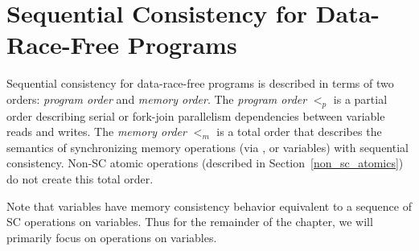 \section{Sequential Consistency for Data-Race-Free Programs}
\label{SC_for_DRF}

Sequential consistency for data-race-free programs is described in
terms of two orders: \textit{program order} and \textit{memory
order}. The \textit{program order} $<_p$ is a partial order describing
serial or fork-join parallelism dependencies between variable reads
and writes. The \textit{memory order} $<_m$ is a total order that
describes the semantics of synchronizing memory operations
(via ,  or  variables) with
sequential consistency. Non-SC atomic operations (described in
Section~\ref{non_sc_atomics}) do not create this total order.

Note that  variables have memory consistency
behavior equivalent to a sequence of SC operations on 
variables.  Thus for the remainder of the chapter, we will primarily
focus on operations on  variables.

